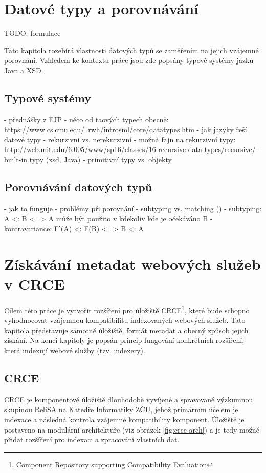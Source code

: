 \documentclass[czech,DP]{thesiskiv}
\begin{document}
 
\chapter{Datové typy a porovnávání}

TODO: formulace

Tato kapitola rozebírá vlastnosti datových typů se zaměřením na jejich vzájemné porovnání. Vzhledem ke kontextu práce jsou zde popsány typové systémy jazků Java a XSD.

\section{Typové systémy}

- přednášky z FJP
- něco od taových typech obecně: https://www.cs.cmu.edu/~rwh/introsml/core/datatypes.htm
- jak jazyky řeší datové typy
	- rekurzivní vs. nerekurzivní
	- možná fajn na rekurzivní typy: http://web.mit.edu/6.005/www/sp16/classes/16-recursive-data-types/recursive/
- built-in typy (xsd, Java)
- primitivní typy vs. objekty

\section{Porovnávání datových typů}

 - jak to funguje
 - problémy při porovnání
 - subtyping vs. matching (\cite{abadi1995subytping})
 - subtyping: A <: B <=> A může být použito v kdekoliv kde je očekáváno B
 - kontravariance: F'(A) <: F(B) <=> B <: A


\chapter{Získávání metadat webových služeb v CRCE}
\label{sec:crce}

Cílem této práce je vytvořit rozšíření pro úložiště CRCE\footnote{Component Repository supporting Compatibility Evaluation}, které bude schopno vyhodnocovat vzájemnou kompatibilitu indexovaných webových služeb. Tato kapitola představuje samotné úložiště, formát metadat a obecný způsob jejich získání. Na konci kapitoly je popsán princip fungování konkrétních rozšíření, která indexují webové služby (tzv. indexery).

\section{CRCE}

CRCE je komponentové úložiště dlouhodobě vyvíjené a spravované výzkumnou skupinou ReliSA na Katedře Informatiky ZČU, jehož primárním účelem je indexace a následná kontrola vzájemné kompatibility komponent. Úložiště je postaveno na modulární architektuře (viz obrázek \ref{fig:crce-arch}) a je tedy možné přidat rozšíření pro indexaci a zpracování vlastních dat.
\end{document}
